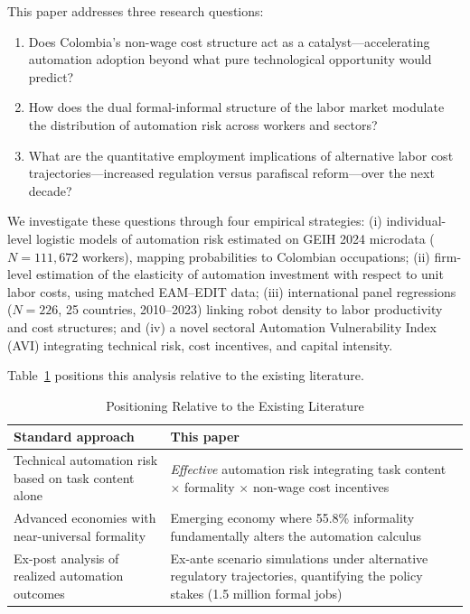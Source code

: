 \documentclass{article}
\begin{document}
This paper addresses three research questions:
\begin{enumerate}[label=(\arabic*)]
\item Does Colombia's non-wage cost structure act as a catalyst---accelerating automation adoption beyond what pure technological opportunity would predict?
\item How does the dual formal-informal structure of the labor market modulate the distribution of automation risk across workers and sectors?
\item What are the quantitative employment implications of alternative labor cost trajectories---increased regulation versus parafiscal reform---over the next decade?
\end{enumerate}

We investigate these questions through four empirical strategies: (i) individual-level logistic models of automation risk estimated on GEIH 2024 microdata ($N = 111{,}672$ workers), mapping \cite{frey2017future} probabilities to Colombian occupations; (ii) firm-level estimation of the elasticity of automation investment with respect to unit labor costs, using matched EAM--EDIT data; (iii) international panel regressions ($N = 226$, 25 countries, 2010--2023) linking robot density to labor productivity and cost structures; and (iv) a novel sectoral Automation Vulnerability Index (AVI) integrating technical risk, cost incentives, and capital intensity.

Table~\ref{tab:contributions} positions this analysis relative to the existing literature.

\begin{table}[htbp]
\centering
\caption{Positioning Relative to the Existing Literature}
\label{tab:contributions}
\begin{tabular}{p{}p{}}
\toprule
\textbf{Standard approach} & \textbf{This paper} \\
\midrule
Technical automation risk based on task content alone \cite{frey2017future, arntz2016} & \textit{Effective} automation risk integrating task content $\times$ formality $\times$ non-wage cost incentives \\[6pt]
Advanced economies with near-universal formality \cite{acemoglu2020robots, dauth2021} & Emerging economy where 55.8\% informality fundamentally alters the automation calculus \\[6pt]
Ex-post analysis of realized automation outcomes & Ex-ante scenario simulations under alternative regulatory trajectories, quantifying the policy stakes (1.5 million formal jobs) \\
\bottomrule
\end{tabular}
\end{table}
\end{document}
